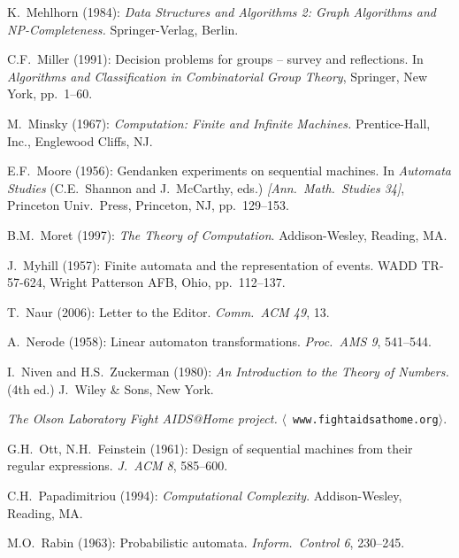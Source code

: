 \begin{thebibliography}{999}
K.~Mehlhorn (1984):
{\it Data Structures and Algorithms 2: Graph Algorithms and
  NP-Completeness.}  Springer-Verlag, Berlin.

C.F.~Miller (1991): Decision problems for groups -- survey and
reflections.  In {\it Algorithms and Classification in Combinatorial
  Group Theory}, Springer, New York, pp.~1--60.

M.~Minsky (1967):
{\it Computation: Finite and Infinite Machines.}
Prentice-Hall, Inc., Englewood Cliffs, NJ. 

E.F.~Moore (1956): Gendanken experiments on sequential machines.  In
{\it Automata Studies} (C.E.~Shannon and J.~McCarthy, eds.) {\it
[Ann.~Math.~Studies 34]}, Princeton Univ.~Press, Princeton, NJ,
pp.~129--153.

B.M.~Moret (1997):
{\it The Theory of Computation}.
Addison-Wesley, Reading, MA.

J.~Myhill (1957): Finite automata and the representation of events.
WADD TR-57-624, Wright Patterson AFB, Ohio, pp.~112--137.


T.~Naur (2006): Letter to the Editor.  {\it Comm.~ACM 49}, 13.

A.~Nerode (1958): Linear automaton transformations.  {\it Proc.~AMS
9}, 541--544.

I.~Niven and H.S.~Zuckerman (1980):
{\it An Introduction to the Theory of Numbers.} (4th ed.)
J.~Wiley \& Sons, New York.


{\it The Olson Laboratory Fight AIDS@Home project.}  $\langle${\tt
www.fightaidsathome.org}$\rangle$.


G.H.~Ott, N.H.~Feinstein (1961): Design of sequential machines from
their regular expressions.  {\it J.~ACM 8}, 585--600.


C.H.~Papadimitriou (1994):
{\it Computational Complexity}.
Addison-Wesley, Reading, MA.


M.O.~Rabin (1963): Probabilistic automata.  {\it Inform.~Control 6},
230--245.


\end{thebibliography}
